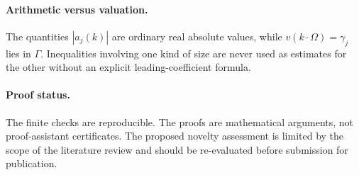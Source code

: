 \documentclass[11pt,letterpaper]{article}
\theoremstyle{definition}
\theoremstyle{remark}
\numberwithin{equation}{section}
\begin{document}
\paragraph{Arithmetic versus valuation.}
The quantities $|a_j(k)|$ are ordinary real absolute values, while
$v(k\cdot\Omega)=\gamma_j$ lies in $\Gamma$.  Inequalities involving one
kind of size are never used as estimates for the other without an explicit
leading-coefficient formula.

\paragraph{Proof status.}
The finite checks are reproducible.  The proofs are mathematical arguments,
not proof-assistant certificates.  The proposed novelty assessment is
limited by the scope of the literature review and should be re-evaluated
before submission for publication.
\end{document}
